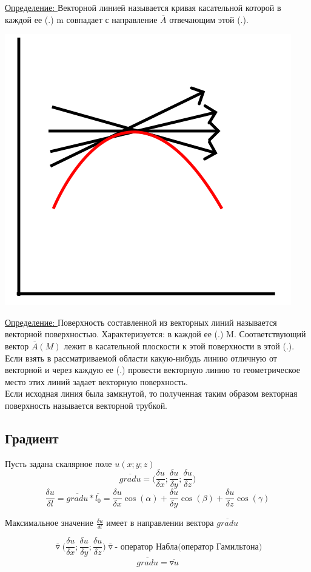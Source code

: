 \documentclass[12pt]{article}
\let\ORIincludegraphics\includegraphics
\renewcommand{\includegraphics}[2][]{\ORIincludegraphics[scale=0.65,#1]{#2}}
\begin{document}
  \begin{minipage}{0.55\textwidth}
    \underline{Определение: } Векторной линией называется кривая касательной которой в каждой ее (.) m совпадает
  с направление $\overline{A}$ отвечающим этой (.).\\
  \end{minipage}
  \hspace{1em}
  \begin{minipage}{0.45\textwidth}
    \includegraphics[scale=0.6]{9.1.png}
  \end{minipage}
  \vspace{1em}
  \par
  \underline{Определение: } Поверхность составленной из векторных линий называется векторной поверхностью.
  Характеризуется: в каждой ее (.) M. Соответствующий вектор $\overline{A}(M)$ лежит в касательной плоскости к
  этой поверхности в этой (.).
  Если взять в рассматриваемой области какую-нибудь линию отличную от векторной и через каждую ее
  (.) провести векторную линию то геометрическое место этих линий задает векторную поверхность.\\
  Если исходная линия была замкнутой, то полученная таким образом векторная поверхность называется 
  векторной трубкой.
  \break
  \subsection{Градиент}
  Пусть задана скалярное поле $u(x;y;z)$
  \[\overline{grad u} = \Big(\frac{\delta u}{\delta x};\frac{\delta u}{\delta y};\frac{\delta u}{\delta z}\Big)\]
  \[\frac{\delta u}{\delta l}=\overline{grad u} * \overline{l_0}=
  \frac{\delta u}{\delta x}\cos(\alpha)+
  \frac{\delta u}{\delta y}\cos(\beta)+
  \frac{\delta u}{\delta z}\cos(\gamma)\]
  \begin{center}
  Максимальное значение $\frac{\delta u}{\delta l}$ имеет в направлении вектора $\overline{gradu}$ 
  \end{center}
  \[\overline{\triangledown}\Big(\frac{\delta u}{\delta x};\frac{\delta u}{\delta y};\frac{\delta u}{\delta z}\Big)
  \overline{\triangledown} \text{- оператор Набла(оператор Гамильтона)}\]
  \[\overline{gradu}=\overline{\triangledown u}\]
\end{document}
